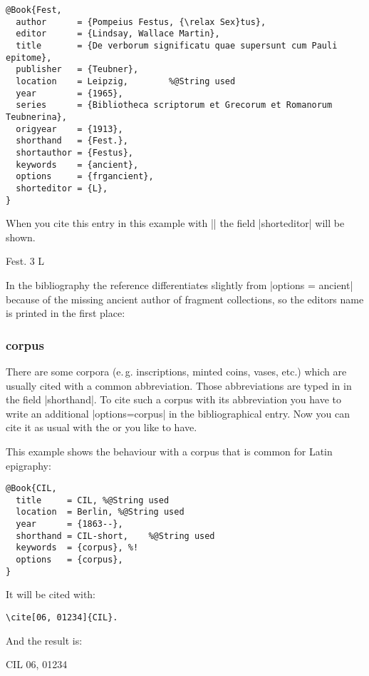 \documentclass[a4paper,
10pt,
greek,
french,
spanish,
italian,
ngerman,
english
]{ltxdoc}
\begin{document}
\begin{lstlisting}[style=bibentry,label=Fest,caption={{@}Book\{Fest,…\} }]
@Book{Fest,
  author      = {Pompeius Festus, {\relax Sex}tus},
  editor      = {Lindsay, Wallace Martin},
  title       = {De verborum significatu quae supersunt cum Pauli epitome},
  publisher   = {Teubner},
  location    = Leipzig, 		%@String used
  year        = {1965},
  series      = {Bibliotheca scriptorum et Grecorum et Romanorum Teubnerina},
  origyear    = {1913},
  shorthand   = {Fest.},
  shortauthor = {Festus},
  keywords    = {ancient},
  options     = {frgancient},
  shorteditor = {L},
}
\end{lstlisting}

When you cite this entry in this example with |\cite[3]{Fest}| the field  |shorteditor| will be shown.
\begin{bsp}
Fest. 3 L
\end{bsp}

In the bibliography the reference differentiates slightly from |options = {ancient}| because of the missing ancient author of fragment collections, 
so the editors name is printed in the first place:

\subsubsection{corpus}\label{corpus}
There are some corpora (e.\,g. inscriptions, minted coins, vases, etc.) which are usually cited with a common abbreviation. 
Those abbreviations are typed in in the field |shorthand|.
To cite such a corpus with its abbreviation you have to write an additional |options={corpus}| in the bibliographical entry.
Now you can cite it as usual with the  or  you like to have.

This example shows the behaviour with a corpus that is common for Latin epigraphy:
\begin{lstlisting}[style=bibentry,label=CIL,caption={{@}Book\{CIL,…\} }]
@Book{CIL,
  title     = CIL, %@String used
  location  = Berlin, %@String used
  year      = {1863--},
  shorthand = CIL-short,	%@String used
  keywords  = {corpus}, %!
  options   = {corpus},
}
\end{lstlisting}

It will be cited with:
\begin{lstlisting}
\cite[06, 01234]{CIL}.
\end{lstlisting}

And the result is:
\begin{bsp}
CIL 06, 01234
\end{bsp}
\end{document}
